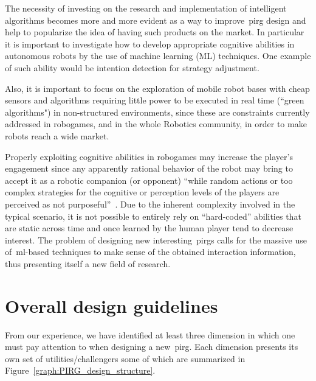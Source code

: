 The necessity of investing on the research and implementation of intelligent algorithms becomes more and more evident as a way to improve~\gls{pirg} design and help to popularize the idea of having such products on the market. In particular it is important to investigate how to develop appropriate cognitive abilities in autonomous robots by the use of machine learning (ML) techniques. One example of such ability would be  intention detection for strategy adjustment. 

Also, it is important to focus on the exploration of mobile robot bases with cheap sensors and algorithms requiring little power to be executed in real time (``green algorithms") in non-structured environments, since these are constraints currently addressed in robogames, and in the whole Robotics community, in order to make robots reach a wide market. 

Properly exploiting cognitive abilities in robogames may increase the player's engagement since any apparently rational behavior of the robot may bring to accept it as a robotic companion (or opponent) ``while random actions or too complex strategies for the cognitive or perception levels of the players are perceived as not purposeful''~\citep{martinoia_physically_2013}. Due to the inherent complexity involved in the typical scenario, it is not possible to entirely rely on ``hard-coded'' abilities that are static across time and once learned by the human player tend to decrease interest. The problem of designing new interesting~\gls{pirg}s calls for the massive use of~\gls{ml}-based techniques to make sense of the obtained interaction information, thus presenting itself a new field of research.

\section{Overall design guidelines}\label{sec:dimensions}
From our experience, we have identified at least three dimension in which one must pay attention to when designing a new~\gls{pirg}. Each dimension presents its own set of utilities/challengers some of which are summarized in Figure~\ref{graph:PIRG_design_structure}. 


